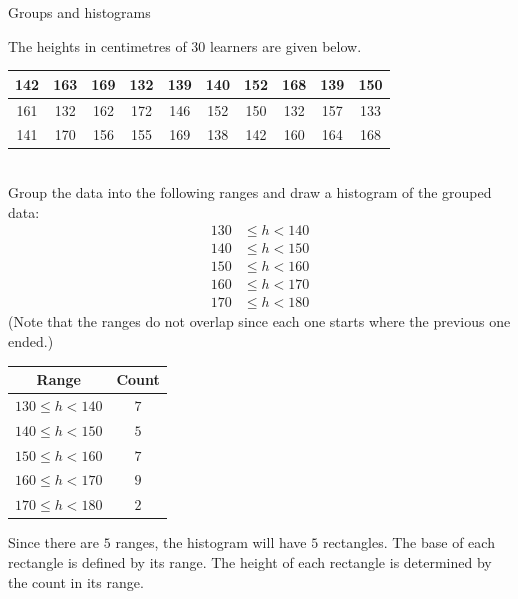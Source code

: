 \begin{wex}{Groups and histograms}{
    The heights in centimetres of $30$ learners are given below.
\\
    \begin{center}
      \begin{tabular}{|c|c|c|c|c|c|c|c|c|c|}\hline
   
        142 & 163 & 169 & 132 & 139 & 140 & 152 & 168 & 139 & 150\\ \hline
        161 & 132 & 162 & 172 & 146 & 152 & 150 & 132 & 157 & 133\\ \hline
        141 & 170 & 156 & 155 & 169 & 138 & 142 & 160 & 164 & 168\\\hline
 
      \end{tabular}
    \end{center}
\vspace {8pt}\\
    Group the data into the following ranges and draw a histogram of the
    grouped data:
    \begin{align*}
      130 &\le h < 140 \\
      140 &\le h < 150 \\
      150 &\le h < 160 \\
      160 &\le h < 170 \\
      170 &\le h < 180
    \end{align*}
    (Note that the ranges do not overlap since each one starts where
    the previous one ended.)
}{
  \begin{center}
    \begin{tabular}{|c|c|} \hline

      \textbf{Range} & \textbf{Count} \\ \hline
    
      $130 \le h < 140$ & $7$ \\ \hline
      $140 \le h < 150$ & $5$ \\\hline
      $150 \le h < 160$ & $7$ \\\hline
      $160 \le h < 170$ & $9$ \\\hline
      $170 \le h < 180$ & $2$ \\\hline

    \end{tabular}
  \end{center}
  

  Since there are $5$ ranges, the histogram will have $5$
  rectangles. The base of each rectangle is defined by its range. The
  height of each rectangle is determined by the count in its range.
  
}
\end{wex}
